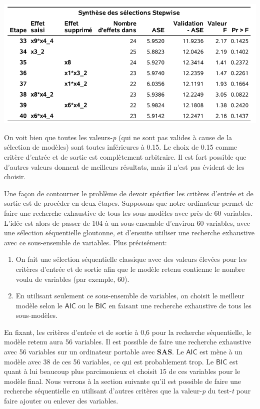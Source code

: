 \documentclass[
  11pt,
  letterpaper,
]{book}
\providecommand{\tightlist}{%
  \setlength{\itemsep}{0pt}\setlength{\parskip}{0pt}}
\theoremstyle{definition}
\theoremstyle{definition}
\theoremstyle{definition}
\theoremstyle{definition}
\theoremstyle{remark}
\begin{document}
\begin{center}\includegraphics[width=0.9\linewidth]{figures/02-select-e9} \end{center}

On voit bien que toutes les valeurs-\emph{p} (qui ne sont pas valides à cause de la sélection de modèles) sont toutes inférieures à 0.15. Le choix de 0.15 comme critère d'entrée et de sortie est complètement arbitraire. Il est fort possible que d'autres valeurs donnent de meilleurs résultats, mais il n'est pas évident de les choisir.

Une façon de contourner le problème de devoir spécifier les critères d'entrée et de sortie est de procéder en deux étapes. Supposons que notre ordinateur permet de faire une recherche exhaustive de tous les sous-modèles avec près de 60 variables. L'idée est alors de passer de 104 à un sous-ensemble d'environ 60 variables, avec une sélection séquentielle gloutonne, et d'ensuite utiliser une recherche exhaustive avec ce sous-ensemble de variables. Plus précisément:

\begin{enumerate}
\def\labelenumi{\arabic{enumi})}
\tightlist
\item
  On fait une sélection séquentielle classique avec des valeurs élevées pour les critères d'entrée et de sortie afin que le modèle retenu contienne le nombre voulu de variables (par exemple, 60).
\item
  En utilisant seulement ce sous-ensemble de variables, on choisit le meilleur modèle selon le \(\mathsf{AIC}\) ou le \(\mathsf{BIC}\) en faisant une recherche exhaustive de tous les sous-modèles.
\end{enumerate}

En fixant, les critères d'entrée et de sortie à 0,6 pour la recherche séquentielle, le modèle retenu aura 56 variables. Il est possible de faire une recherche exhaustive avec 56 variables sur un ordinateur portable avec \textbf{SAS}. Le \(\mathsf{AIC}\) est mène à un modèle avec 38 de ces 56 variables, ce qui est probablement trop. Le \(\mathsf{BIC}\) est quant à lui beaucoup plus parcimonieux et choisit 15 de ces variables pour le modèle final. Nous verrons à la section suivante qu'il est possible de faire une recherche séquentielle en utilisant d'autres critères que la valeur-\emph{p} du test-\emph{t} pour faire ajouter ou enlever des variables.
\end{document}
